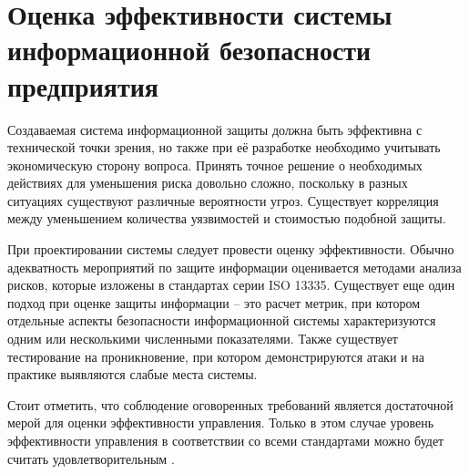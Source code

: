 
\section{Оценка эффективности системы информационной безопасности предприятия}
\label{sec:efficiency}

Создаваемая система информационной защиты должна быть
эффективна с технической точки зрения, но также при её разработке
необходимо учитывать экономическую сторону вопроса. Принять точное
решение о необходимых действиях для уменьшения риска довольно сложно,
поскольку в разных ситуациях существуют различные вероятности угроз.
Существует корреляция между уменьшением количества уязвимостей и
стоимостью подобной защиты.

При проектировании системы следует провести оценку эффективности. Обычно адекватность мероприятий по защите информации оценивается методами анализа рисков, которые изложены в стандартах серии ISO 13335. Существует еще один подход при оценке защиты информации -- это расчет метрик, при котором отдельные аспекты безопасности информационной системы характеризуются одним или несколькими численными показателями. Также существует тестирование на проникновение, при котором
демонстрируются атаки и на практике выявляются слабые места системы.

Стоит отметить, что соблюдение оговоренных требований является
достаточной мерой для оценки эффективности управления. Только в этом
случае уровень эффективности управления в соответствии со всеми
стандартами можно будет считать удовлетворительным \cite{medium_cybersecurity_kpi}.


